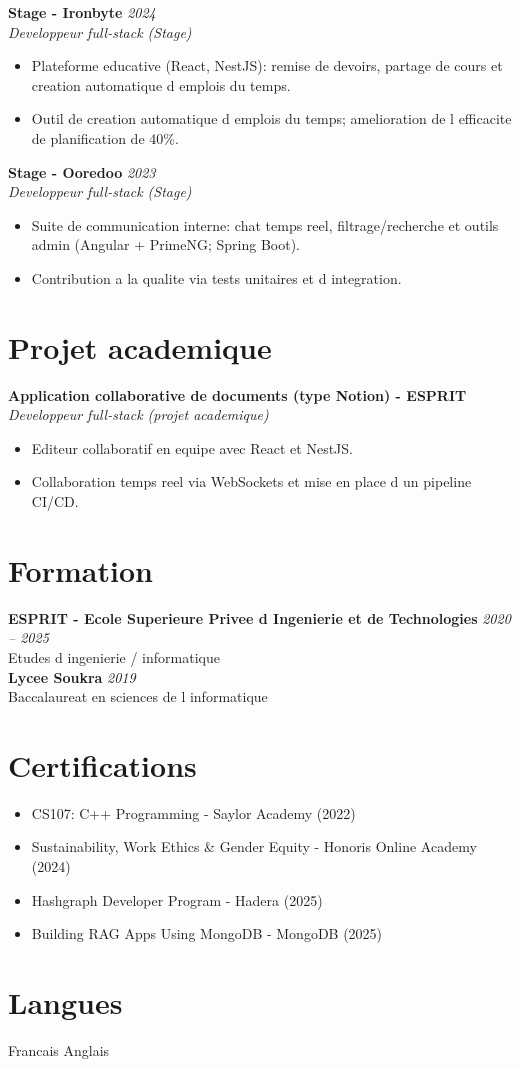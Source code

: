 \documentclass[9pt,a4paper]{article}
\begin{document}
\textbf{Stage - Ironbyte} \hfill \textit{2024}\\
\textit{Developpeur full-stack (Stage)}
\begin{itemize}
  \item Plateforme educative (React, NestJS): remise de devoirs, partage de cours et creation automatique d emplois du temps.
  \item Outil de creation automatique d emplois du temps; amelioration de l efficacite de planification de 40\%.
\end{itemize}

\textbf{Stage - Ooredoo} \hfill \textit{2023}\\
\textit{Developpeur full-stack (Stage)}
\begin{itemize}
  \item Suite de communication interne: chat temps reel, filtrage/recherche et outils admin (Angular + PrimeNG; Spring Boot).
  \item Contribution a la qualite via tests unitaires et d integration.
\end{itemize}

\section*{Projet academique}
\textbf{Application collaborative de documents (type Notion) - ESPRIT}\\
\textit{Developpeur full-stack (projet academique)}
\begin{itemize}
  \item Editeur collaboratif en equipe avec React et NestJS.
  \item Collaboration temps reel via WebSockets et mise en place d un pipeline CI/CD.
\end{itemize}

\section*{Formation}
\textbf{ESPRIT - Ecole Superieure Privee d Ingenierie et de Technologies} \hfill \textit{2020 -- 2025}\\
Etudes d ingenierie / informatique\\
\vspace{2pt}
\textbf{Lycee Soukra} \hfill \textit{2019}\\
Baccalaureat en sciences de l informatique

\section*{Certifications}
\begin{itemize}
  \item CS107: C++ Programming - Saylor Academy (2022)
  \item Sustainability, Work Ethics \& Gender Equity - Honoris Online Academy (2024)
  \item Hashgraph Developer Program - Hadera (2025)
  \item Building RAG Apps Using MongoDB - MongoDB (2025)
\end{itemize}

\section*{Langues}
Francais \textbar{} Anglais
\end{document}
